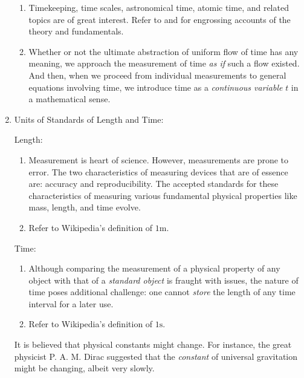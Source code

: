 \documentclass[12pt,a4paper]{book}
\begin{document}
\begin{enumerate}
\begin{enumerate}
            \item Timekeeping, time scales, astronomical time, atomic time, and related topics are of great interest. Refer to \cite{sundials-atomic} and \cite{nbs-time-freq} for engrossing accounts of the theory and fundamentals.
            \item Whether or not the ultimate abstraction of uniform flow of time has any meaning, we approach the measurement of time \emph{as if} such a flow existed. And then, when we proceed from individual measurements to general equations involving time, we introduce time as a \emph{continuous variable} $t$ in a mathematical sense.
        \end{enumerate}
    \item Units of Standards of Length and Time:

        Length:
        \begin{enumerate}
            \item Measurement is heart of science. However, measurements are prone to error. The two characteristics of measuring devices that are of essence are: accuracy and reproducibility. The accepted standards for these characteristics of measuring various fundamental physical properties like mass, length, and time evolve. 
            \item Refer to Wikipedia's definition of $1\si{\metre}$.
        \end{enumerate}
        
        Time:
        \begin{enumerate}
            \item Although comparing the measurement of a physical property of any object with that of a \emph{standard object} is fraught with issues, the nature of time poses additional challenge: one cannot \emph{store} the length of any time interval for a later use.
            \item Refer to Wikipedia's definition of $1\si{\second}$.
        \end{enumerate}

        It is believed that physical constants might change. For instance, the great physicist P. A. M. Dirac suggested that the \emph{constant} of universal gravitation might be changing, albeit very slowly.


\end{enumerate}
\end{document}
